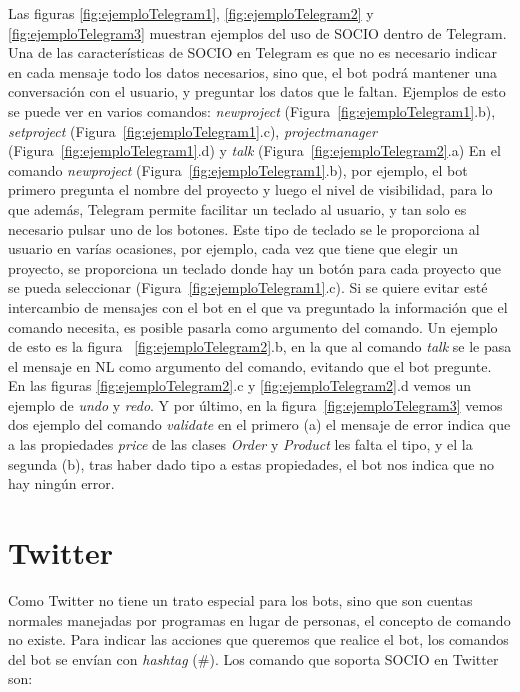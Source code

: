 Las figuras \ref{fig:ejemploTelegram1}, \ref{fig:ejemploTelegram2} y \ref{fig:ejemploTelegram3} muestran ejemplos del uso de SOCIO dentro de Telegram. Una de las características de SOCIO en Telegram es que no es necesario indicar en cada mensaje todo los datos necesarios, sino que, el bot podrá mantener una conversación con el usuario, y preguntar los datos que le faltan. Ejemplos de esto se puede ver en varios comandos:  \textit{newproject} (Figura~\ref{fig:ejemploTelegram1}.b),  \textit{setproject} (Figura~\ref{fig:ejemploTelegram1}.c),  \textit{projectmanager} (Figura~\ref{fig:ejemploTelegram1}.d) y  \textit{talk} (Figura~\ref{fig:ejemploTelegram2}.a) En el comando \textit{newproject} (Figura~\ref{fig:ejemploTelegram1}.b), por ejemplo, el bot primero pregunta el nombre del proyecto y luego el nivel de visibilidad, para lo que además, Telegram permite facilitar un teclado al usuario, y tan solo es necesario pulsar uno de los botones. Este tipo de teclado se le proporciona al usuario en varías ocasiones, por ejemplo, cada vez que tiene que elegir un proyecto, se proporciona un teclado donde hay un botón para cada proyecto que se pueda seleccionar (Figura~\ref{fig:ejemploTelegram1}.c). Si se quiere evitar esté intercambio de mensajes con el bot en el que va preguntado la información que el comando necesita, es posible pasarla como argumento del comando. Un ejemplo de esto es la figura ~\ref{fig:ejemploTelegram2}.b, en la que al comando \textit{talk} se le pasa el mensaje en NL como argumento del comando, evitando que el bot pregunte. 
En las figuras \ref{fig:ejemploTelegram2}.c y \ref{fig:ejemploTelegram2}.d vemos un ejemplo de \textit{undo} y \textit{redo}. Y por último, en la figura~\ref{fig:ejemploTelegram3} vemos dos ejemplo del comando \textit{validate} en el primero (a) el mensaje de error indica que a las propiedades \textit{price} de las clases \textit{Order} y \textit{Product} les falta el tipo, y el la segunda (b), tras haber dado tipo a estas propiedades, el bot nos indica que no hay ningún error. 
\section{Twitter}

Como Twitter no tiene un trato especial para los bots, sino que son cuentas normales manejadas por programas en lugar de personas, el concepto de comando no existe. Para indicar las acciones que queremos que realice el bot, los comandos del bot se envían con \textit{hashtag} (\#). Los comando que soporta SOCIO en Twitter son:

